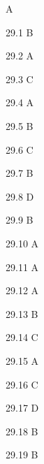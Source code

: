 \begin{Solution}{29}
A
\end{Solution}
\begin{Solution}{29.{1}}
B
\end{Solution}
\begin{Solution}{29.{2}}
A
\end{Solution}
\begin{Solution}{29.{3}}
C
\end{Solution}
\begin{Solution}{29.{4}}
A
\end{Solution}
\begin{Solution}{29.{5}}
B
\end{Solution}
\begin{Solution}{29.{6}}
C
\end{Solution}
\begin{Solution}{29.{7}}
B
\end{Solution}
\begin{Solution}{29.{8}}
D
\end{Solution}
\begin{Solution}{29.{9}}
B
\end{Solution}
\begin{Solution}{29.{10}}
A
\end{Solution}
\begin{Solution}{29.{11}}
A
\end{Solution}
\begin{Solution}{29.{12}}
A
\end{Solution}
\begin{Solution}{29.{13}}
B
\end{Solution}
\begin{Solution}{29.{14}}
C
\end{Solution}
\begin{Solution}{29.{15}}
A
\end{Solution}
\begin{Solution}{29.{16}}
C
\end{Solution}
\begin{Solution}{29.{17}}
D
\end{Solution}
\begin{Solution}{29.{18}}
B
\end{Solution}
\begin{Solution}{29.{19}}
B
\end{Solution}
